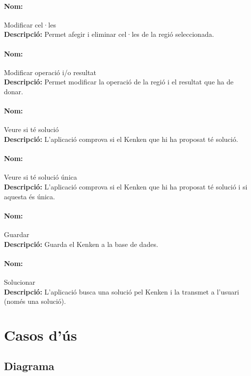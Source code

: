 \documentclass[a4paper,12pt]{article}
\begin{document}
\paragraph{Nom:} Modificar cel·les\\
\textbf{Descripció:}
Permet afegir i eliminar cel·les de la regió seleccionada.

\paragraph{Nom:} Modificar operació i/o resultat\\
\textbf{Descripció:}
Permet modificar la operació de la regió i el resultat que ha de donar.

\paragraph{Nom:} Veure si té solució\\
\textbf{Descripció:} 
L'aplicació comprova si el Kenken que hi ha proposat té solució.

\paragraph{Nom:} Veure si té solució única\\
\textbf{Descripció:} 
L'aplicació comprova si el Kenken que hi ha proposat té solució i si 
aquesta és única.

\paragraph{Nom:} Guardar\\
\textbf{Descripció:} 
Guarda el Kenken a la base de dades.

\paragraph{Nom:} Solucionar\\
\textbf{Descripció:} 
L'aplicació busca una solució pel Kenken i la transmet a l'usuari (només una solució).

\newpage
\section{Casos d'ús}
\subsection{Diagrama}
\end{document}
